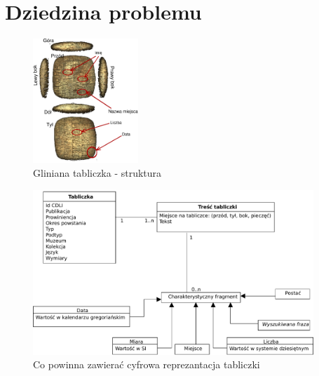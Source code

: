 \chapter{Dziedzina problemu}

\begin{figure}
 \centering
 \includegraphics[width=150px]{../diagramy/tabliczka.pdf}
 \caption{\label{fig:tabliczka}Gliniana tabliczka - struktura}
\end{figure}



\begin{figure}
 \centering
 \includegraphics[width=400px]{../diagramy/Model-dziedziny.pdf}
 \caption{Co powinna zawierać cyfrowa reprezantacja tabliczki}
\end{figure}
~ 

